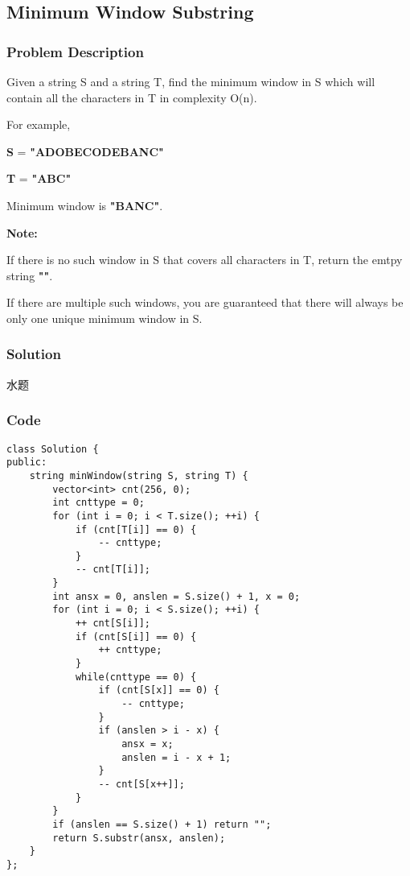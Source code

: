 \documentclass[courier]{article}
\begin{document}
\begin{CJK*}{UTF8}{gkai}
\subsection{ Minimum Window Substring }

\subsubsection*{Problem Description}
Given a string S and a string T, find the minimum window in S which will contain all the characters in T in complexity O(n).

For example,


\textbf{S} = \textbf{"ADOBECODEBANC"}


\textbf{T} = \textbf{"ABC"}

Minimum window is \textbf{"BANC"}.

\textbf{Note:}


If there is no such window in S that covers all characters in T, return the emtpy string \textbf{""}.

If there are multiple such windows, you are guaranteed that there will always be only one unique minimum window in S.



\subsubsection*{Solution}
水题

\subsubsection*{Code}
\begin{lstlisting}
class Solution {
public:
    string minWindow(string S, string T) {
        vector<int> cnt(256, 0);
        int cnttype = 0;
        for (int i = 0; i < T.size(); ++i) {
            if (cnt[T[i]] == 0) {
                -- cnttype;
            }
            -- cnt[T[i]];
        }
        int ansx = 0, anslen = S.size() + 1, x = 0;
        for (int i = 0; i < S.size(); ++i) {
            ++ cnt[S[i]];
            if (cnt[S[i]] == 0) {
                ++ cnttype;
            }
            while(cnttype == 0) {
                if (cnt[S[x]] == 0) {
                    -- cnttype;
                }
                if (anslen > i - x) {
                    ansx = x;
                    anslen = i - x + 1;
                }
                -- cnt[S[x++]];
            }
        }
        if (anslen == S.size() + 1) return "";
        return S.substr(ansx, anslen);
    }
}; 
\end{lstlisting}



\end{CJK*}
\end{document}

